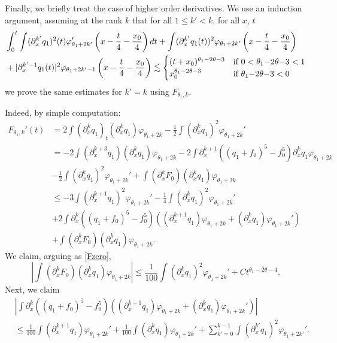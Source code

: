 \documentclass[11pt,a4paper,reqno]{amsart}
\theoremstyle{remark}
\numberwithin{equation}{section}
\begin{document}
Finally, we briefly treat the case of higher order derivatives.
We use an induction argument, assuming at the rank $k$  that for all
$1\leq k'<k$,  for all $x$, $t$
\begin{align}\nonumber
& \int_0^t \int (\partial_x^{k'} q_1)^2(t) \varphi_{\theta_1+2k'}' \left( x - \frac t4-\frac {x_0} 4\right) dt
+
\int (\partial_x^{k'} q_1(t))^2 \varphi_{\theta_1+2k'}\left( x - \frac t4-\frac {x_0} 4\right) \\ &\label{ply2}
+|\partial_x^{k'-1} q_1(t)|^2 \varphi_{\theta_1+2k'-1}\left( x - \frac t4-\frac {x_0} 4\right) 
  \lesssim \begin{cases} (t+x_0)^{ \theta_1 -2 \theta-3 } & \hbox{if $0<\theta_1 {-}2 \theta{-}3<1$}  \\
  x_0^{ \theta_1 -2 \theta-3 } & \hbox{if $\theta_1 {-}2 \theta{-}3<0$} \end{cases}
\end{align}
we prove the same estimates for $k'=k$ using $F_{\theta_1,k}$.

Indeed, by simple computation:
\begin{align*}
F_{\theta_1,k}'(t) & = 2 \int (\partial_x^k  q_1)_t (\partial_x^k q_1) \varphi_{\theta_1+2k} -
\frac 12 \int (\partial_x^k q_1)^2 \varphi_{\theta_1+2k}'\\
& = - 2 \int (\partial_x^{k+3} q_1) (\partial_x^k q_1) \varphi_{\theta_1+2k} 
- 2 \int \partial_x^{k+1} \left( (q_1+f_0)^5 -f_0^5\right) \partial_x^k q_1 \varphi_{\theta_1+2k}\\
& - \frac 12 \int (\partial_x^k q_1)^2 \varphi_{\theta_1+2k}'+ \int (\partial_x^k F_0) (\partial_x^k q_1) \varphi_{\theta_1+2k} \\
& \leq - 3 \int (\partial_x^{k+1} q_1)^2 \varphi_{\theta_1+2k}' - \frac 14 \int (\partial_x^k q_1)^2 \varphi_{\theta_1+2k}'\\
& + 2 \int \partial_x^k \left( (q_1+f_0)^5 - f_0^5\right) 
\left( (\partial_x^{k+1} q_1) \varphi_{\theta_1+2k} + (\partial_x^k q_1) \varphi_{\theta_1+2k}'\right)
\\ & + \int (\partial_x^k F_0) (\partial_x^k q_1) \varphi_{\theta_1+2k}.
\end{align*}
We claim, arguing as \eqref{Fzero},
$$
\left| \int (\partial_x^k F_0) (\partial_x^k q_1) \varphi_{\theta_1+2k} \right| 
\leq \frac 1{100}\int (\partial_x^k q_1)^2  \varphi_{\theta_1+2k}'+ C t^{\theta_1-2 \theta -4}.
$$
Next, we claim
\begin{align}
& \left|\int \partial_x^k \left( (q_1+f_0)^5 - f_0^5\right) 
\left( (\partial_x^{k+1} q_1) \varphi_{\theta_1+2k} + (\partial_x^k q_1) \varphi_{\theta_1+2k}'\right)\right|\nonumber \\
& \leq \frac 1{100}\int (\partial_x^{k+1} q_1) \varphi_{\theta_1+2k}'+\frac 1{100}\int (\partial_x^{k} q_1) \varphi_{\theta_1+2k}'+\sum_{k'=0}^{k-1} \int (\partial_x^{k'} q_1)^2  \varphi_{\theta_1+2k'}' .\label{ply3}
\end{align}
\end{document}
